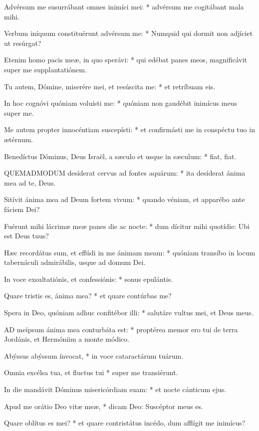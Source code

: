 Advérsum me susurrábant omnes inimíci mei: * advérsum me cogitábant mala mihi.

Verbum iníquum constituérunt advérsum me: * Numquid qui dormit non adjíciet ut resúrgat?

Etenim homo pacis meæ, in quo sperávi: * qui edébat panes meos, magnificávit super me supplantatiónem.

Tu autem, Dómine, miserére mei, et resúscita me: * et retríbuam eis.

In hoc cognóvi quóniam voluísti me: * quóniam non gaudébit inimícus meus super me.

Me autem propter innocéntiam suscepísti: * et confirmásti me in conspéctu tuo in ætérnum.

Benedíctus Dóminus, Deus Israël, a sæculo et usque in sæculum: * fiat, fiat.


\lettrine[lines=2]{Q}{UEMADMODUM} desíderat cervus ad fontes aquárum: * ita desíderat ánima mea ad te, Deus.

Sitívit ánima mea ad Deum fortem vivum: * quando véniam, et apparébo ante fáciem Dei?

Fuérunt mihi lácrimæ meæ panes die ac nocte: * dum dícitur mihi quotídie: Ubi est Deus tuus?

Hæc recordátus sum, et effúdi in me ánimam meam: * quóniam transíbo in locum tabernáculi admirábilis, usque ad domum Dei.

In voce exsultatiónis, et confessiónis: * sonus epulántis.

Quare tristis es, ánima mea? * et quare contúrbas me?

Spera in Deo, quóniam adhuc confitébor illi: * salutáre vultus mei, et Deus meus.


\lettrine[lines=2]{A}{D} meípsum ánima mea conturbáta est: * proptérea memor ero tui de terra Jordánis, et Hermóniim a monte módico.

Abýssus abýssum ínvocat, * in voce cataractárum tuárum.

Omnia excélsa tua, et fluctus tui * super me transiérunt.

In die mandávit Dóminus misericórdiam suam: * et nocte cánticum ejus.

Apud me orátio Deo vitæ meæ, * dicam Deo: Suscéptor meus es.

Quare oblítus es mei? * et quare contristátus incédo, dum afflígit me inimícus?

